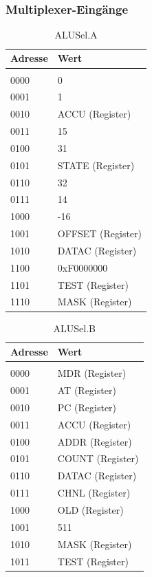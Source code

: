 \documentclass[12pt,titlepage]{article}
\begin{document}
\leavevmode \\

\newpage

\subsubsection{Multiplexer-Eingänge}

\begin{table}[h!]
    \begin{tabular}{l|l}
    Adresse & Wert              \\
    \hline  					\\
    0000     & 0                 \\
    0001     & 1                 \\
    0010     & ACCU (Register)   \\
    0011     & 15                \\
    0100     & 31                \\
    0101     & STATE (Register)  \\
    0110     & 32                \\
    0111     & 14                \\
    1000     & -16               \\
    1001     & OFFSET (Register) \\
    1010     & DATAC (Register)  \\
    1100     & 0xF0000000        \\
    1101     & TEST (Register)   \\
    1110     & MASK (Register)   \\
    \end{tabular}
    \caption{ALUSel.A}
\end{table}

\begin{table}[h!]
    \begin{tabular}{l|l}
    Adresse & Wert            \\
    \hline                    \\
    0000     & MDR (Register)  \\
    0001     & AT (Register)   \\
    0010     & PC (Register)   \\
    0011     & ACCU (Register) \\
    0100     & ADDR (Register) \\
    0101     & COUNT (Register) \\
    0110     & DATAC (Register) \\
    0111     & CHNL (Register) \\
    1000     & OLD (Register)  \\
    1001     & 511             \\
    1010     & MASK (Register) \\
    1011     & TEST (Register) \\
    \end{tabular}
    \caption{ALUSel.B}
\end{table}
\end{document}
